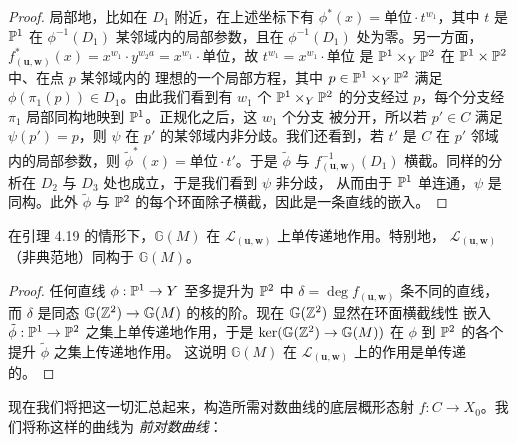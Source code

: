 \begin{proof}
局部地，比如在 $D_1$ 附近，在上述坐标下有 $\phi^*(x) = \text{单位}\cdot t^{w_1}$，其中 $t$ 是 $\mathbb{P}^1$ 在
$\phi^{-1}(D_1)$ 某邻域内的局部参数，且在 $\phi^{-1}(D_1)$ 处为零。另一方面，
$f^*_{(\mathbf{u},\mathbf{w})}(x) = x^{w_1}\cdot y^{w_2a} = x^{w_1}\cdot\text{单位}$，故
$t^{w_1} = x^{w_1}\cdot\text{单位}$ 是 $\mathbb{P}^1\times_Y\mathbb{P}^2$ 在 $\mathbb{P}^1\times\mathbb{P}^2$ 中、在点 $p$ 某邻域内的
理想的一个局部方程，其中 $p\in\mathbb{P}^1\times_Y\mathbb{P}^2$ 满足 $\phi(\pi_1(p))\in D_1$。由此我们看到有 $w_1$ 个
$\mathbb{P}^1\times_Y\mathbb{P}^2$ 的分支经过 $p$，每个分支经 $\pi_1$ 局部同构地映到 $\mathbb{P}^1$。正规化之后，这 $w_1$ 个分支
被分开，所以若 $p'\in C$ 满足 $\psi(p') = p$，则 $\psi$ 在 $p'$ 的某邻域内非分歧。我们还看到，若 $t'$ 是 $C$
在 $p'$ 邻域内的局部参数，则 $\tilde\phi^*(x) = \text{单位}\cdot t'$。于是 $\tilde\phi$ 与
$f^{-1}_{(\mathbf{u},\mathbf{w})}(D_1)$ 横截。同样的分析在 $D_2$ 与 $D_3$ 处也成立，于是我们看到 $\psi$ 非分歧，
从而由于 $\mathbb{P}^1$ 单连通，$\psi$ 是同构。此外 $\tilde\phi$ 与 $\mathbb{P}^2$ 的每个环面除子横截，因此是一条直线的嵌入。
\end{proof}

\begin{corollary}
在引理 4.19 的情形下，$\mathbb{G}(M)$ 在 $\mathcal{L}_{(\mathbf{u},\mathbf{w})}$ 上单传递地作用。特别地，
$\mathcal{L}_{(\mathbf{u},\mathbf{w})}$（非典范地）同构于 $\mathbb{G}(M)$。
\end{corollary}

\begin{proof}
任何直线 $\phi : \mathbb{P}^1 \to Y$ 至多提升为 $\mathbb{P}^2$ 中 $\delta = \deg f_{(\mathbf{u},\mathbf{w})}$ 条不同的直线，
而 $\delta$ 是同态 $\mathbb{G}(\mathbb{Z}^2)\to\mathbb{G}(M)$ 的核的阶。现在 $\mathbb{G}(\mathbb{Z}^2)$ 显然在环面横截线性
嵌入 $\tilde\phi : \mathbb{P}^1 \to \mathbb{P}^2$ 之集上单传递地作用，于是
$\ker(\mathbb{G}(\mathbb{Z}^2)\to\mathbb{G}(M))$ 在 $\phi$ 到 $\mathbb{P}^2$ 的各个提升 $\tilde\phi$ 之集上传递地作用。
这说明 $\mathbb{G}(M)$ 在 $\mathcal{L}_{(\mathbf{u},\mathbf{w})}$ 上的作用是单传递的。
\end{proof}

现在我们将把这一切汇总起来，构造所需对数曲线的底层概形态射 $f : C \to X_0$。我们将称这样的曲线为
\emph{前对数曲线}：

